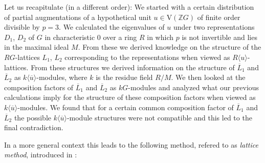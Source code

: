 \documentclass[10pt,a4paper,reqno]{amsart}
\theoremstyle{definition}
\theoremstyle{remark}
\newcommand{\V}{\mathrm{V}}
\newcommand{\ZZ}{\mathbb{Z}}
\begin{document}
Let us recapitulate (in a different order): We started with a certain distribution of partial augmentations of a hypothetical unit $u \in \V(\ZZ G)$ of finite order divisible by $p = 3$. We calculated the eigenvalues of $u$ under two representations $D_1$, $D_2$ of $G$ in characteristic $0$ over a ring $R$ in which $p$ is not invertible and lies in the maximal ideal $M$. From these we derived knowledge on the structure of the $RG$-lattices $L_1$, $L_2$ corresponding to the representations when viewed as $R\langle u \rangle$-lattices. From these structures we derived information on the structure of $\overline{L}_1$ and $\overline{L}_2$ as $k\langle \overline{u} \rangle$-modules, where $k$ is the residue field $R/M$. We then looked at the composition factors of $\overline{L}_1$ and $\overline{L}_2$ as $kG$-modules and analyzed what our previous calculations imply for the structure of these composition factors when viewed as $k \langle \overline{u} \rangle$-modules. We found that for a certain common composition factor of $\overline{L}_1$ and $\overline{L}_2$ the possible $k \langle \overline{u} \rangle$-module structures were not compatible and this led to the final contradiction.

In a more general context this leads to the following method, refered to as \emph{lattice method}, introduced in \cite{BM17}:
\end{document}

